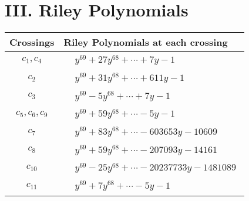 \documentclass[1p]{elsarticle_modified}
\theoremstyle{definition}
\begin{document}
\centering \section*{ III. Riley Polynomials}
\begin{tabular}{m{50pt}|m{274pt}}
Crossings & \hspace{64pt}Riley Polynomials at each crossing \\
\hline $$\begin{aligned}c_{1},c_{4}\end{aligned}$$&$\begin{aligned}
&y^{69}+27 y^{68}+\cdots+7 y-1
\end{aligned}$\\
\hline $$\begin{aligned}c_{2}\end{aligned}$$&$\begin{aligned}
&y^{69}+31 y^{68}+\cdots+611 y-1
\end{aligned}$\\
\hline $$\begin{aligned}c_{3}\end{aligned}$$&$\begin{aligned}
&y^{69}-5 y^{68}+\cdots+7 y-1
\end{aligned}$\\
\hline $$\begin{aligned}c_{5},c_{6},c_{9}\end{aligned}$$&$\begin{aligned}
&y^{69}+59 y^{68}+\cdots-5 y-1
\end{aligned}$\\
\hline $$\begin{aligned}c_{7}\end{aligned}$$&$\begin{aligned}
&y^{69}+83 y^{68}+\cdots-603653 y-10609
\end{aligned}$\\
\hline $$\begin{aligned}c_{8}\end{aligned}$$&$\begin{aligned}
&y^{69}+59 y^{68}+\cdots-207093 y-14161
\end{aligned}$\\
\hline $$\begin{aligned}c_{10}\end{aligned}$$&$\begin{aligned}
&y^{69}-25 y^{68}+\cdots-20237733 y-1481089
\end{aligned}$\\
\hline $$\begin{aligned}c_{11}\end{aligned}$$&$\begin{aligned}
&y^{69}+7 y^{68}+\cdots-5 y-1
\end{aligned}$\\
\hline
\end{tabular}
\vskip 2pc
\end{document}
